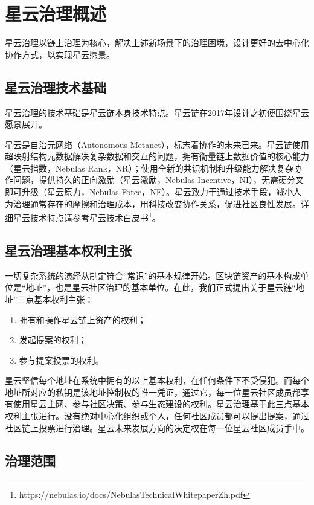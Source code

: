 \section{星云治理概述}

星云治理以链上治理为核心，解决上述新场景下的治理困境，设计更好的去中心化协作方式，以实现星云愿景。

\subsection{星云治理技术基础}

星云治理的技术基础是星云链本身技术特点。星云链在2017年设计之初便围绕星云愿景展开。

星云是自治元网络（Autonomous Metanet），标志着协作的未来已来。星云链使用超映射结构元数据解决复杂数据和交互的问题，拥有衡量链上数据价值的核心能力（星云指数，Nebulas Rank，NR）；使用全新的共识机制和升级能力解决复杂协作问题，提供持久的正向激励（星云激励，Nebulas Incentive，NI），无需硬分叉即可升级（星云原力，Nebulas Force，NF）。星云致力于通过技术手段，减小人为治理通常存在的摩擦和治理成本，用科技改变协作关系，促进社区良性发展。详细星云技术特点请参考星云技术白皮书\footnote{https://nebulas.io/docs/NebulasTechnicalWhitepaperZh.pdf}。

\subsection{星云治理基本权利主张}

一切复杂系统的演绎从制定符合“常识”的基本规律开始。区块链资产的基本构成单位是“地址”，也是星云社区治理的基本单位。在此，我们正式提出关于星云链“地址”三点基本权利主张：

\begin{enumerate}
	\item 拥有和操作星云链上资产的权利；
	\item 发起提案的权利；
	\item 参与提案投票的权利。
\end{enumerate}

星云坚信每个地址在系统中拥有的以上基本权利，在任何条件下不受侵犯。而每个地址所对应的私钥是该地址控制权的唯一凭证，通过它，每一位星云社区成员都享有使用星云主网、参与社区决策、参与生态建设的权利。星云治理基于此三点基本权利主张进行。没有绝对中心化组织或个人，任何社区成员都可以提出提案，通过社区链上投票进行治理。星云未来发展方向的决定权在每一位星云社区成员手中。

\subsection{治理范围}

